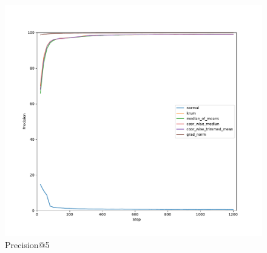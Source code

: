 \documentclass[10pt]{article}
\begin{document}
\begin{figure}
	\centering
	\includegraphics[width=.8\textwidth]{prec5.pdf}
	\caption{Precision@5}
\end{figure}
\end{document}
